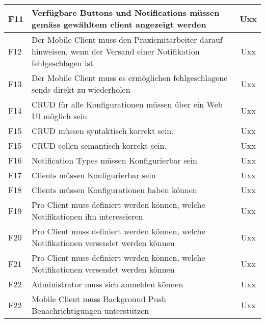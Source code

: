 \begin{table}[h]
\begin{tabular}{|l|p{13cm}|c|}
        \hline
        F11        & Verfügbare Buttons und Notifications müssen gemäss gewähltem client angezeigt werden & Uxx \\
        \hline
        F12        & Der Mobile Client muss den Praxismitarbeiter darauf hinweisen, wenn der Versand einer Notifikation fehlgeschlagen ist & Uxx \\
        \hline
        F13        & Der Mobile Client muss es ermöglichen fehlgeschlagene sends direkt zu wiederholen & Uxx \\
        \hline
        F14        & CRUD für alle Konfigurationen müssen über ein Web UI möglich sein                                                     & Uxx                 \\
        \hline
        F15        & CRUD müssen syntaktisch korrekt sein.                                                                                 & Uxx                 \\
        \hline
        F15        & CRUD sollen semantisch korrekt sein.                                                                                 & Uxx                 \\
        \hline
        F16        & Notification Types müssen Konfigurierbar sein                                                                         & Uxx                 \\
        \hline
        F17        & Clients müssen Konfigurierbar sein                                                                                    & Uxx                 \\
        \hline
        F18        & Clients müssen Konfigurationen haben können                                                                           & Uxx                 \\
        \hline
        F19        & Pro Client muss definiert werden können, welche Notifikationen ihn interessieren & Uxx \\
        \hline
        F20        & Pro Client muss definiert werden können, welche Notifikationen versendet werden können & Uxx \\
        \hline
        F21        & Pro Client muss definiert werden können, welche Notifikationen versendet werden können & Uxx \\
        \hline
        F22        & Administrator muss sich anmelden können & Uxx \\
        \hline
        F22        & Mobile Client muss Background Push Benachrichtigungen unterstützen & Uxx \\
        \hline

    \end{tabular}\label{tab:features1}
\end{table}


